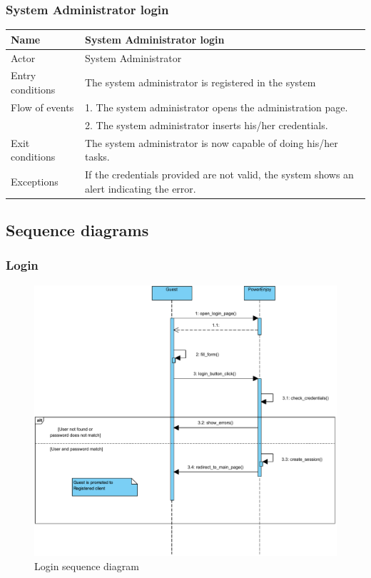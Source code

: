 \subsubsection{System Administrator login}
\begin{table}[!h]
\begin{tabularx}{\linewidth}{l|X}
\centering
Name & System Administrator login \\ \hline
Actor & System Administrator \\ \hline
Entry conditions & The system administrator is registered in the system\\ \hline
Flow of events & 1. The system administrator opens the administration page. \\
& 2. The system administrator inserts his/her credentials.\\ \hline
Exit conditions & The system administrator is now capable of doing his/her tasks. \\ \hline
Exceptions & If the credentials provided are not valid, the system shows an alert indicating the error. \\
\end{tabularx}
\end{table}

\subsection{Sequence diagrams}

\subsubsection{Login}
\begin{figure}[H]
\centering
\includegraphics[width=\textwidth, keepaspectratio]{../images/diagram/sequence/login.pdf}
\caption{Login sequence diagram}
\end{figure}


